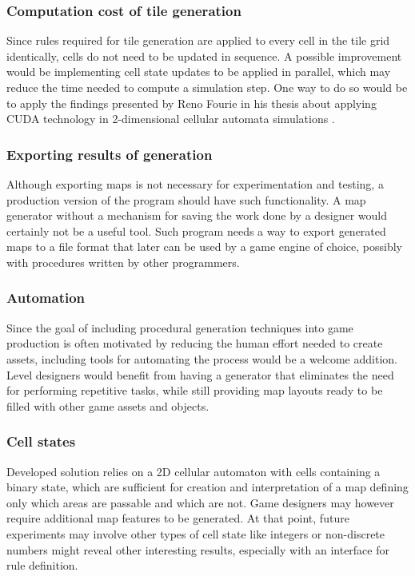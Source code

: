 \documentclass[12pt]{report}
\begin{document}
\subsubsection{Computation cost of tile generation}

Since rules required for tile generation are applied to every cell in the tile grid identically, cells do not need to be updated in sequence. A possible improvement would be implementing cell state updates to be applied in parallel, which may reduce the time needed to compute a simulation step. One way to do so would be to apply the findings presented by Reno Fourie in his thesis about applying CUDA technology in 2-dimensional cellular automata simulations \autocite{fourie2015parallel}.  

\subsubsection{Exporting results of generation}

Although exporting maps is not necessary for experimentation and testing, a production version of the program should have such functionality. A map generator without a mechanism for saving the work done by a designer would certainly not be a useful tool. Such program needs a way to export generated maps to a file format that later can be used by a game engine of choice, possibly with procedures written by other programmers. 

\subsubsection{Automation}

Since the goal of including procedural generation techniques into game production is often motivated by reducing the human effort needed to create assets, including tools for automating the process would be a welcome addition. Level designers would benefit from having a generator that eliminates the need for performing repetitive tasks, while still providing map layouts ready to be filled with other game assets and objects.

\subsubsection{Cell states}

Developed solution relies on a 2D cellular automaton with cells containing a binary state, which are sufficient for creation and interpretation of a map defining only which areas are passable and which are not. Game designers may however require additional map features to be generated. At that point, future experiments may involve other types of cell state like integers or non-discrete numbers might reveal other interesting results, especially with an interface for rule definition. 
\end{document}
